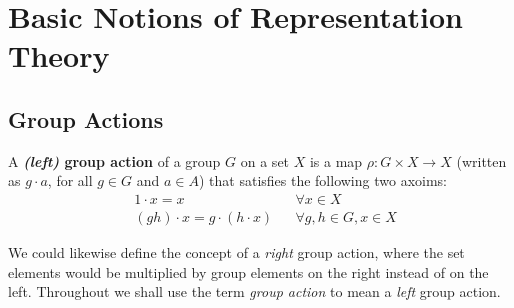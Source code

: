 
\chapter{Basic Notions of Representation Theory} %






%
\section {Group Actions}
\begin{defn}\label{def-grp-action}
A  \textbf{\textit{(left)} group action} of a group $G$ on a set $X$ is a map $\rho \colon G \times X \to X$ (written as $g \cdot a$, for all $g \in G$ and $a \in A$) that satisfies the following two axoims:
\begin{align}
\label{grp-action-axiom-1}&1 \cdot  x = x && \forall x \in X\\
\label{grp-action-axiom-2}&(gh) \cdot x  = g \cdot (h \cdot x) && \forall g,h \in G, x \in X
\end{align}
\end{defn}
\begin{note}
We could likewise define the concept of a \textit{right} group action, where the set elements would be multiplied by group elements on the right instead of on the left.  Throughout we shall use the term \textit{group action} to mean a \textit{left} group action.
\end{note}



